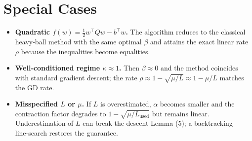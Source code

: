 \documentclass{article}
\begin{document}
\section*{Special Cases}
\begin{itemize}
\item \textbf{Quadratic $f(w)=\tfrac12 w^{\top}Qw-b^{\top}w$.} The algorithm reduces to the classical heavy‑ball method with the same optimal $\beta$ and attains the exact linear rate $\rho$ because the inequalities become equalities.
\item \textbf{Well‑conditioned regime $\kappa\approx1$.} Then $\beta\approx0$ and the method coincides with standard gradient descent; the rate $\rho\approx1-\sqrt{\mu/L}\approx1-\mu/L$ matches the GD rate.
\item \textbf{Misspecified $L$ or $\mu$.} If $L$ is overestimated, $\alpha$ becomes smaller and the contraction factor degrades to $1-\sqrt{\mu/L_{\text{used}}}$ but remains linear. Underestimation of $L$ can break the descent Lemma (5); a backtracking line‑search restores the guarantee.
\end{itemize}

\end{document}
